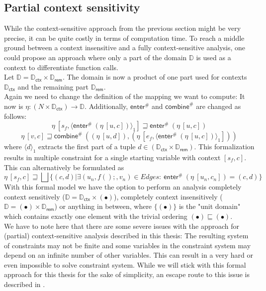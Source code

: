     \subsection{Partial context sensitivity}
    While the context-sensitive approach from the previous section might be very precise, it can be quite costly in terms of computation time. To reach a middle ground between a context insensitive and a fully context-sensitive analysis, one could propose an approach where only a part of the domain $\mathbb{D}$ is used as a context to differentiate function calls.\\
    Let $\mathbb{D} = \mathbb{D}_\textsf{ctx} \times \mathbb{D}_\textsf{rem}$. The domain is now a product of one part used for contexts $\mathbb{D}_\textsf{ctx}$ and the remaining part $\mathbb{D}_\textsf{rem}$.\\ 
    Again we need to change the definition of the mapping we want to compute: It now is $\eta: (N \times \mathbb{D}_\textsf{ctx}) \rightarrow \mathbb{D}$. Additionally, $\textsf{enter}^{\#}$ and $\textsf{combine}^{\#}$ are changed as follows:
    \[\eta\ [s_f, \langle \textsf{enter}^{\#}\ (\eta\ [u, c]) \rangle_1] \sqsupseteq \textsf{enter}^{\#}\ (\eta\ [u, c]) \]
    \[\eta\ [v, c] \sqsupseteq \textsf{combine}^{\#}\ ((\eta\ [u, d]), (\eta\ [e_f, \langle \textsf{enter}^{\#}\ (\eta\ [u, c]) \rangle_1 ])) \]
    where $\langle d \rangle_1$ extracts the first part of a tuple $d \in (\mathbb{D}_\textsf{ctx} \times \mathbb{D}_\textsf{rem})$. This formalization results in multiple constraint for a single starting variable with context $[s_f, c]$. This can alternatively be formulated as 
    \[\eta\ [s_f, c] \sqsupseteq \bigsqcup \{ (c, d) | \exists (u_n, f();, v_n) \in Edges:\ \textsf{enter}^{\#}\ (\eta\ [u_n, c_n]) = (c, d) \} \]
    With this formal model we have the option to perform an analysis completely context sensitively ($\mathbb{D} = \mathbb{D}_\textsf{ctx} \times (\bullet)$), completely context insensitively ($\mathbb{D} = (\bullet) \times \mathbb{D}_\textsf{rem}$) or anything in between, where $\{(\bullet)\}$ is the "unit domain" which contains exactly one element with the trivial ordering $(\bullet) \sqsubseteq (\bullet)$.
    \\
    We have to note here that there are some severe issues with the approach for (partial) context-sensitive analysis described in this thesis: The resulting system of constraints may not be finite and some variables in the constraint system may depend on an infinite number of other variables. This can result in a very hard or even impossible to solve constraint system. While we will stick with this formal approach for this thesis for the sake of simplicity, an escape route to this issue is described in \parencite{apinis2012side}.

